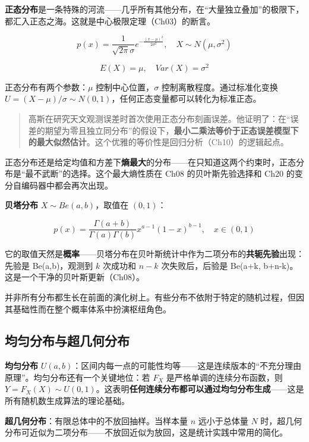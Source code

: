 \documentclass[
]{book}
\begin{document}
\textbf{正态分布}是一条特殊的河流------几乎所有其他分布，在``大量独立叠加''的极限下，都汇入正态之海。这就是中心极限定理（Ch03）的断言。

\[p(x) = \frac{1}{\sqrt{2\pi}\sigma} e^{-\frac{(x-\mu)^2}{2\sigma^2}}, \quad X \sim N(\mu, \sigma^2)\]

\[E(X) = \mu, \quad Var(X) = \sigma^2\]

正态分布有两个参数：\(\mu\) 控制中心位置，\(\sigma\) 控制离散程度。通过标准化变换 \(U = (X - \mu)/\sigma \sim N(0,1)\)，任何正态变量都可以转化为标准正态。

\begin{quote}
高斯在研究天文观测误差时首次使用正态分布刻画误差。他证明了：在``误差的期望为零且独立同分布''的假设下，\textbf{最小二乘法等价于正态误差模型下的最大似然估计}。这个优雅的等价性是回归分析（Ch10）的逻辑起点。
\end{quote}

正态分布还是给定均值和方差下\textbf{熵最大}的分布------在只知道这两个约束时，正态分布是``最不武断''的选择。这个最大熵性质在 Ch08 的贝叶斯先验选择和 Ch20 的变分自编码器中都会再次出现。

\textbf{贝塔分布} \(X \sim Be(a, b)\)，取值在 \((0, 1)\)：

\[p(x) = \frac{\Gamma(a+b)}{\Gamma(a)\Gamma(b)} x^{a-1} (1-x)^{b-1}, \quad x \in (0,1)\]

它的取值天然是\textbf{概率}------贝塔分布在贝叶斯统计中作为二项分布的\textbf{共轭先验}出现：先验是 Be(a,b)，观测到 \(k\) 次成功和 \(n-k\) 次失败后，后验是 Be(a+k, b+n-k)。这是一个干净的贝叶斯更新（Ch08）。

并非所有分布都生长在前面的演化树上。有些分布不依附于特定的随机过程，但因其基础性而在整个概率体系中扮演枢纽角色。

\subsection{均匀分布与超几何分布}\label{ux5747ux5300ux5206ux5e03ux4e0eux8d85ux51e0ux4f55ux5206ux5e03}

\textbf{均匀分布} \(U(a,b)\)：区间内每一点的可能性均等------这是连续版本的``不充分理由原理''。均匀分布还有一个关键地位：若 \(F_X\) 是严格单调的连续分布函数，则 \(Y = F_X(X) \sim U(0,1)\)。这表明\textbf{任何连续分布都可以通过均匀分布生成}------这是所有随机数生成算法的理论基础。

\textbf{超几何分布}：有限总体中的不放回抽样。当样本量 \(n\) 远小于总体量 \(N\) 时，超几何分布可近似为二项分布------不放回近似为放回，这是统计实践中常用的简化。
\end{document}
